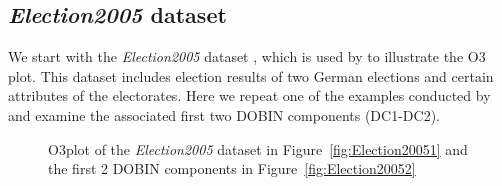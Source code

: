 \documentclass[11pt]{article}
\begin{document}
\subsection{\textit{Election2005} dataset}\label{sec:ResWithVis1}
We start with the \textit{Election2005} dataset \citep{mbgraphic}, which is used by \cite{unwin2019multivariate}  to illustrate the O3 plot. This dataset includes election results of two German elections and certain attributes of the electorates. Here we repeat one of the examples conducted by  \cite{unwin2019multivariate} and examine the associated  first two DOBIN components (DC1-DC2). \\

\begin{figure}[!t]
	\centering
	\caption{O3plot of the \textit{Election2005} dataset in Figure~\ref{fig:Election20051} and the first 2 DOBIN components in Figure~\ref{fig:Election20052} }
	\label{fig:Election2005}
\end{figure}
\end{document}
